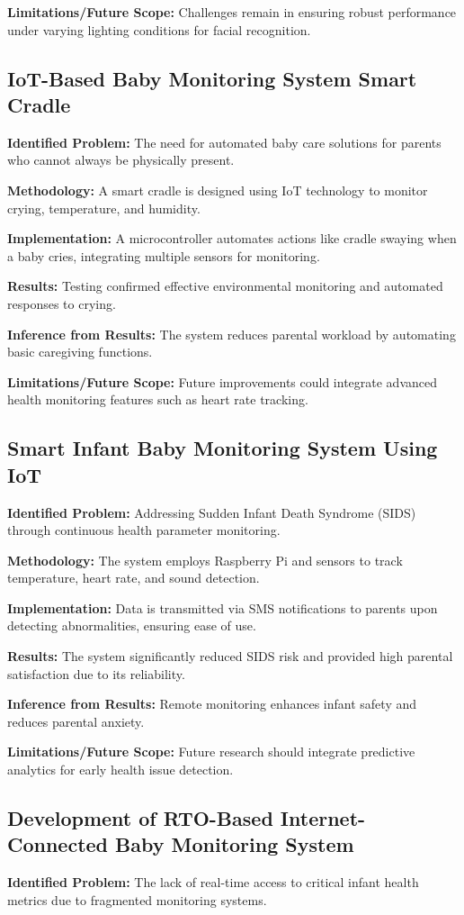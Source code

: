 \documentclass[conference]{IEEEtran}
\begin{document}
\textbf{Limitations/Future Scope:} Challenges remain in ensuring robust performance under varying lighting conditions for facial recognition.

\subsection{IoT-Based Baby Monitoring System Smart Cradle}
\textbf{Identified Problem:} The need for automated baby care solutions for parents who cannot always be physically present.

\textbf{Methodology:} A smart cradle is designed using IoT technology to monitor crying, temperature, and humidity.

\textbf{Implementation:} A microcontroller automates actions like cradle swaying when a baby cries, integrating multiple sensors for monitoring.

\textbf{Results:} Testing confirmed effective environmental monitoring and automated responses to crying.

\textbf{Inference from Results:} The system reduces parental workload by automating basic caregiving functions.

\textbf{Limitations/Future Scope:} Future improvements could integrate advanced health monitoring features such as heart rate tracking.

\subsection{Smart Infant Baby Monitoring System Using IoT}
\textbf{Identified Problem:} Addressing Sudden Infant Death Syndrome (SIDS) through continuous health parameter monitoring.

\textbf{Methodology:} The system employs Raspberry Pi and sensors to track temperature, heart rate, and sound detection.

\textbf{Implementation:} Data is transmitted via SMS notifications to parents upon detecting abnormalities, ensuring ease of use.

\textbf{Results:} The system significantly reduced SIDS risk and provided high parental satisfaction due to its reliability.

\textbf{Inference from Results:} Remote monitoring enhances infant safety and reduces parental anxiety.

\textbf{Limitations/Future Scope:} Future research should integrate predictive analytics for early health issue detection.

\subsection{Development of RTO-Based Internet-Connected Baby Monitoring System}
\textbf{Identified Problem:} The lack of real-time access to critical infant health metrics due to fragmented monitoring systems.
\end{document}
